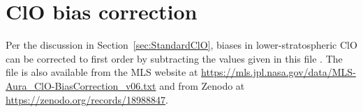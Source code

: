 \section{ClO bias correction}
\label{appsec:ClO}

Per the discussion in Section~\ref{sec:StandardClO}, biases in lower-stratospheric ClO can be corrected to first order by subtracting the values given in this file . The file is also available from the MLS website at \url{https://mls.jpl.nasa.gov/data/MLS-Aura_ClO-BiasCorrection_v06.txt} and from Zenodo at \url{https://zenodo.org/records/18988847}.